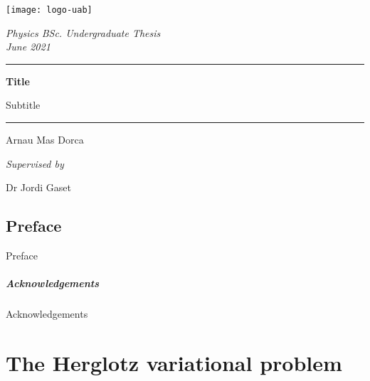 \documentclass[12pt, oneside]{book}
\title{}
\author{Arnau Mas}
\date{}
\begin{document}
\begin{titlepage}
	\centering \sffamily

	\vspace*{2cm}

	\texttt{[image: logo-uab]}

	\vspace{2cm}

	{\Large \itshape Physics BSc. Undergraduate Thesis} \\
	{\large \itshape June 2021}

	\vspace{10pt}
	\hrule
	\vspace{10pt}
	{\bfseries \LARGE Title}

	{\Large Subtitle}
	\vspace{10pt}
	\hrule		
	\vspace{2cm}

	{\LARGE Arnau Mas Dorca}

	\vspace{1cm}
	{\large \itshape Supervised by}

	{\Large Dr Jordi Gaset}
\end{titlepage}
\thispagestyle{empty}

\pagestyle{plain}
\frontmatter
{\footnotesize \sffamily \tableofcontents}

\pagebreak
{}
\section*{Preface}
Preface

\paragraph{Acknowledgements}
Acknowledgements

\mainmatter
\pagestyle{main}

\chapter{The Herglotz variational problem}\label{ch:herglotz}


\chapter{}\label{ch:}


\backmatter

\pagestyle{plain}
\printbibliography
\end{document}

